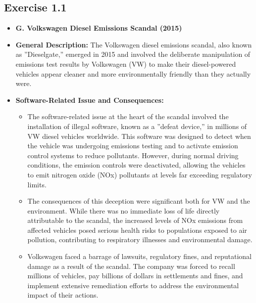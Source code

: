 \documentclass[a4paper]{scrartcl}
\begin{document}
\subsection*{Exercise 1.1}
\begin{itemize}
  \item \textbf{G. Volkswagen Diesel Emissions Scandal (2015)}

  \item \textbf{General Description:} The Volkswagen diesel emissions scandal, also known as ''Dieselgate,'' emerged in 2015 and involved the deliberate manipulation of emissions test results by Volkswagen (VW) to make their diesel-powered vehicles appear cleaner and more environmentally friendly than they actually were.

  \item \textbf{Software-Related Issue and Consequences:}
        \begin{itemize}
          \item The software-related issue at the heart of the scandal involved the installation of illegal software, known as a ''defeat device,''
                in millions of VW diesel vehicles worldwide. This software was designed to detect when the vehicle was undergoing emissions testing
                and to activate emission control systems to reduce pollutants.
                However, during normal driving conditions, the emission controls were deactivated, allowing the vehicles to
                emit nitrogen oxide (NOx) pollutants at levels far exceeding regulatory limits.

          \item The consequences of this deception were significant both for VW and the environment.
                While there was no immediate loss of life directly attributable to the scandal,
                the increased levels of NOx emissions from affected vehicles posed serious health risks to populations exposed to air pollution,
                contributing to respiratory illnesses and environmental damage.

          \item Volkswagen faced a barrage of lawsuits, regulatory fines, and reputational damage as a result of the scandal.
                The company was forced to recall millions of vehicles, pay billions of dollars in settlements and fines,
                and implement extensive remediation efforts to address the environmental impact of their actions.
        \end{itemize}


\end{itemize}
\end{document}
